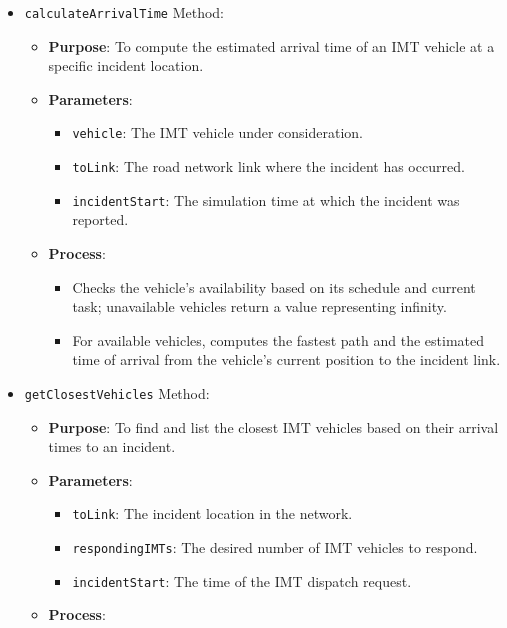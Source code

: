 \documentclass[fancy, oneside, mastersfancy, ms]{byuthesis}
\providecommand{\tightlist}{%
  \setlength{\itemsep}{0pt}\setlength{\parskip}{0pt}}\usepackage{longtable,booktabs,array}
\begin{document}
\begin{itemize}
\tightlist
\item
  \texttt{calculateArrivalTime} Method:

  \begin{itemize}
  \tightlist
  \item
    \textbf{Purpose}: To compute the estimated arrival time of an IMT
    vehicle at a specific incident location.
  \item
    \textbf{Parameters}:

    \begin{itemize}
    \tightlist
    \item
      \texttt{vehicle}: The IMT vehicle under consideration.
    \item
      \texttt{toLink}: The road network link where the incident has
      occurred.
    \item
      \texttt{incidentStart}: The simulation time at which the incident
      was reported.
    \end{itemize}
  \item
    \textbf{Process}:

    \begin{itemize}
    \tightlist
    \item
      Checks the vehicle's availability based on its schedule and
      current task; unavailable vehicles return a value representing
      infinity.
    \item
      For available vehicles, computes the fastest path and the
      estimated time of arrival from the vehicle's current position to
      the incident link.
    \end{itemize}
  \end{itemize}
\item
  \texttt{getClosestVehicles} Method:

  \begin{itemize}
  \tightlist
  \item
    \textbf{Purpose}: To find and list the closest IMT vehicles based on
    their arrival times to an incident.
  \item
    \textbf{Parameters}:

    \begin{itemize}
    \tightlist
    \item
      \texttt{toLink}: The incident location in the network.
    \item
      \texttt{respondingIMTs}: The desired number of IMT vehicles to
      respond.
    \item
      \texttt{incidentStart}: The time of the IMT dispatch request.
    \end{itemize}
  \item
    \textbf{Process}:


\end{itemize}
\end{itemize}
\end{document}
